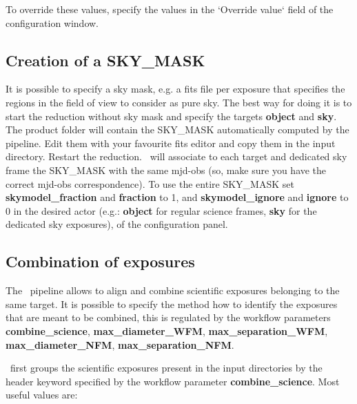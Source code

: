 To override these values, specify the values in the `Override value`
field of the configuration window.

\subsection{Creation of a SKY\_MASK}

It is possible to specify a sky mask, e.g. a fits file per exposure
that specifies the regions in the field of view to consider as pure
sky.  The best way for doing it is to start the reduction without sky
mask and specify the targets {\bf object} and {\bf sky}. The product
folder will contain the SKY\_MASK automatically computed by the
pipeline. Edit them with your favourite fits editor and copy them in
the input directory. Restart the reduction. \edps\ will associate to
each target and dedicated sky frame the SKY\_MASK with the same
mjd-obs (so, make sure you have the correct mjd-obs correspondence).
To use the entire SKY\_MASK set {\bf skymodel\_fraction} and {\bf
  fraction} to 1, and {\bf skymodel\_ignore} and {\bf ignore} to 0 in
the desired actor (e.g.: {\bf object} for regular science frames, {\bf
  sky} for the dedicated sky exposures), of the configuration panel.


\subsection{Combination of exposures}
\label{sec:configuration_combination}

The \instname\ pipeline allows to align and combine scientific
exposures belonging to the same target.  It is possible to specify the
method how to identify the exposures that are meant to be combined,
this is regulated by the workflow parameters {\bf combine\_science},
{\bf max\_diameter\_WFM}, {\bf max\_separation\_WFM}, {\bf max\_diameter\_NFM},
{\bf max\_separation\_NFM}.

\edps\ first groups the scientific exposures present in the input
directories by the header keyword specified by the workflow parameter
{\bf combine\_science}. Most useful values are:

